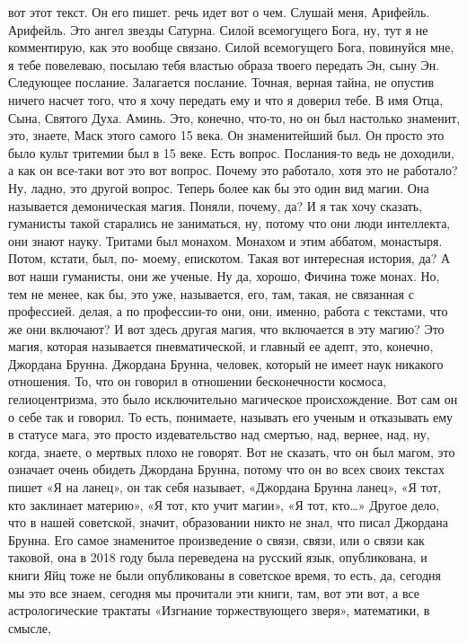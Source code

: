 вот этот текст. Он его пишет. речь идет вот о чем. Слушай меня, Арифейль.
Арифейль. Это ангел звезды Сатурна. Силой всемогущего Бога, ну, тут я не
комментирую, как это вообще связано. Силой всемогущего Бога, повинуйся мне, я
тебе повелеваю, посылаю тебя властью образа твоего передать Эн, сыну Эн.
Следующее послание. Залагается послание. Точная, верная тайна, не опустив ничего
насчет того, что я хочу передать ему и что я доверил тебе. В имя Отца, Сына,
Святого Духа. Аминь. Это, конечно, что-то, но он был настолько знаменит, это,
знаете, Маск этого самого 15 века. Он знаменитейший был. Он просто это было
культ тритемии был в 15 веке. Есть вопрос. Послания-то ведь не доходили, а как
он все-таки вот это вот вопрос. Почему это работало, хотя это не работало? Ну,
ладно, это другой вопрос. Теперь более как бы это один вид магии. Она называется
демоническая магия. Поняли, почему, да? И я так хочу сказать, гуманисты такой
старались не заниматься, ну, потому что они люди интеллекта, они знают науку.
Тритами был монахом. Монахом и этим аббатом, монастыря. Потом, кстати, был, по-
моему, епискотом. Такая вот интересная история, да? А вот наши гуманисты, они же
ученые. Ну да, хорошо, Фичина тоже монах. Но, тем не менее, как бы, это уже,
называется, его, там, такая, не связанная с профессией. делая, а по профессии-то
они, они, именно, работа с текстами, что же они включают? И вот здесь другая
магия, что включается в эту магию? Это магия, которая называется пневматической,
и главный ее адепт, это, конечно, Джордана Брунна. Джордана Брунна, человек,
который не имеет наук никакого отношения. То, что он говорил в отношении
бесконечности космоса, гелиоцентризма, это было исключительно магическое
происхождение. Вот сам он о себе так и говорил. То есть, понимаете, называть его
ученым и отказывать ему в статусе мага, это просто издевательство над смертью,
над, вернее, над, ну, когда, знаете, о мертвых плохо не говорят. Вот не сказать,
что он был магом, это означает очень обидеть Джордана Брунна, потому что он во
всех своих текстах пишет «Я на ланец», он так себя называет, «Джордана Брунна
ланец», «Я тот, кто заклинает материю», «Я тот, кто учит магии», «Я тот, кто…»
Другое дело, что в нашей советской, значит, образовании никто не знал, что писал
Джордана Брунна. Его самое знаменитое произведение о связи, связи, или о связи
как таковой, она в 2018 году была переведена на русский язык, опубликована, и
книги Яйц тоже не были опубликованы в советское время, то есть, да, сегодня мы
это все знаем, сегодня мы прочитали эти книги, там, вот эти вот, а все
астрологические трактаты «Изгнание торжествующего зверя», математики, в смысле,
